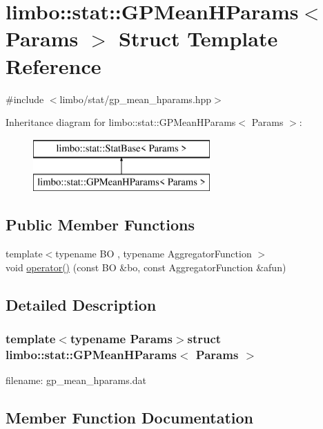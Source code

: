 \hypertarget{structlimbo_1_1stat_1_1_g_p_mean_h_params}{}\section{limbo\+:\+:stat\+:\+:G\+P\+Mean\+H\+Params$<$ Params $>$ Struct Template Reference}
\label{structlimbo_1_1stat_1_1_g_p_mean_h_params}


{\ttfamily \#include $<$limbo/stat/gp\+\_\+mean\+\_\+hparams.\+hpp$>$}

Inheritance diagram for limbo\+:\+:stat\+:\+:G\+P\+Mean\+H\+Params$<$ Params $>$\+:\begin{figure}[H]
\begin{center}
\leavevmode
\includegraphics[height=2.000000cm]{structlimbo_1_1stat_1_1_g_p_mean_h_params}
\end{center}
\end{figure}
\subsection*{Public Member Functions}
\begin{DoxyCompactItemize}
\item 
{\footnotesize template$<$typename B\+O , typename Aggregator\+Function $>$ }\\void \hyperlink{structlimbo_1_1stat_1_1_g_p_mean_h_params_a668c9a82a1ae88273a44f48a4b6f4612}{operator()} (const B\+O \&bo, const Aggregator\+Function \&afun)
\end{DoxyCompactItemize}


\subsection{Detailed Description}
\subsubsection*{template$<$typename Params$>$struct limbo\+::stat\+::\+G\+P\+Mean\+H\+Params$<$ Params $>$}

filename\+: {\ttfamily gp\+\_\+mean\+\_\+hparams.\+dat} 

\subsection{Member Function Documentation}
\hypertarget{structlimbo_1_1stat_1_1_g_p_mean_h_params_a668c9a82a1ae88273a44f48a4b6f4612}{}
